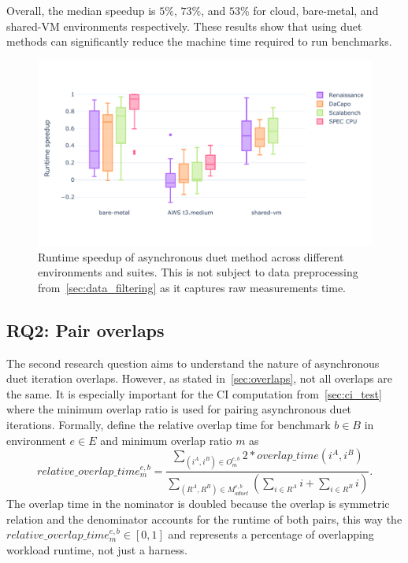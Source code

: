 Overall, the median speedup is $5\%$, $73\%$, and $53\%$ for cloud, bare-metal, and shared-VM environments respectively.
These results show that using duet methods can significantly reduce the machine time required to run benchmarks.

\begin{figure}
	\centering
	\includegraphics[width=.9\linewidth]{./figures/runtime_speedup.pdf}
	\caption{
		Runtime speedup of asynchronous duet method across different environments and suites.
		This is not subject to data preprocessing from~\cref{sec:data_filtering} as it captures raw measurements time.
	}
	\label{fig:runtime_speedup}
\end{figure}

\subsection{RQ2: Pair overlaps}
\label{sec:rq2}

The second research question aims to understand the nature of asynchronous duet iteration overlaps.
However, as stated in~\cref{sec:overlaps}, not all overlaps are the same.
It is especially important for the CI computation from~\ref{sec:ci_test} where the minimum overlap ratio is used for pairing asynchronous duet iterations.
Formally, define the relative overlap time for benchmark $b \in B$ in environment $e \in E$ and minimum overlap ratio $m$ as
\begin{equation}\label{eq:relative_overlap_time}
relative\_overlap\_time^{e, b}_m = \frac{\sum\limits_{(i^A, i^B) \in O^{e,b}_m} 2 * overlap\_time(i^A, i^B)}{\sum\limits_{(R^A, R^B) \in M^{e, b}_{aduet}}\left(\sum\limits_{i \in R^A} i + \sum\limits_{i \in R^B} i\right)}.
\end{equation}
The overlap time in the nominator is doubled because the overlap is symmetric relation and the denominator accounts for the runtime of both pairs, this way the $relative\_overlap\_time^{e, b}_m \in [0, 1]$ and represents a percentage of overlapping workload runtime, not just a harness.


